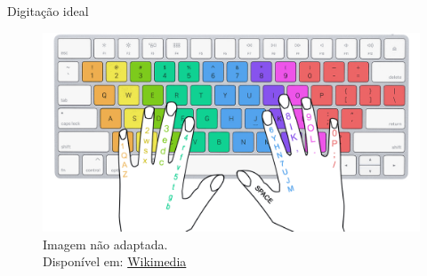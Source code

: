 \begin{frame}{Digitação ideal}
    \begin{figure}
        \centering
        \includegraphics[width=\linewidth]{Image/Finger_position_on_a_keyboard.png}
        \label{finger-position}
        \footnotesize
        \\ Imagem não adaptada. \\
        Disponível em:  \hyperlink{https://commons.wikimedia.org/wiki/File:Finger_position_on_a_keyboard.png}{Wikimedia}
    \end{figure}
\end{frame}


